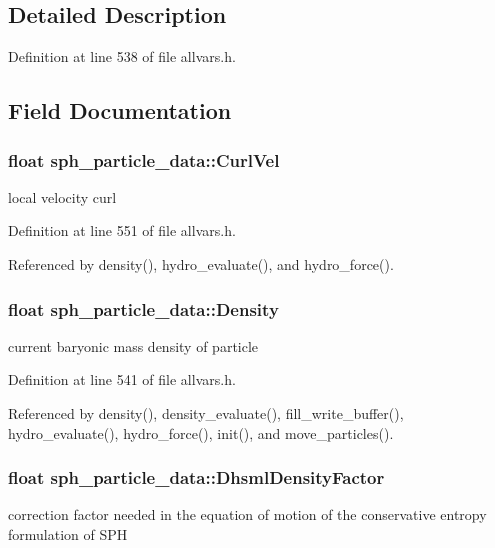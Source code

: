 \subsection{Detailed Description}


Definition at line 538 of file allvars.h.



\subsection{Field Documentation}
\hypertarget{structsph__particle__data_a843c827a50c8783218cd850925deb575}{
\subsubsection[{CurlVel}]{\setlength{\rightskip}{0pt plus 5cm}float {\bf sph\_\-particle\_\-data::CurlVel}}}
\label{structsph__particle__data_a843c827a50c8783218cd850925deb575}
local velocity curl 

Definition at line 551 of file allvars.h.



Referenced by density(), hydro\_\-evaluate(), and hydro\_\-force().

\hypertarget{structsph__particle__data_aaeca7f3efec44ebd5b7d36ce79d38779}{
\subsubsection[{Density}]{\setlength{\rightskip}{0pt plus 5cm}float {\bf sph\_\-particle\_\-data::Density}}}
\label{structsph__particle__data_aaeca7f3efec44ebd5b7d36ce79d38779}
current baryonic mass density of particle 

Definition at line 541 of file allvars.h.



Referenced by density(), density\_\-evaluate(), fill\_\-write\_\-buffer(), hydro\_\-evaluate(), hydro\_\-force(), init(), and move\_\-particles().

\hypertarget{structsph__particle__data_af49cca403dc402fdb0d0d481d49d7b53}{
\subsubsection[{DhsmlDensityFactor}]{\setlength{\rightskip}{0pt plus 5cm}float {\bf sph\_\-particle\_\-data::DhsmlDensityFactor}}}
\label{structsph__particle__data_af49cca403dc402fdb0d0d481d49d7b53}
correction factor needed in the equation of motion of the conservative entropy formulation of SPH 

